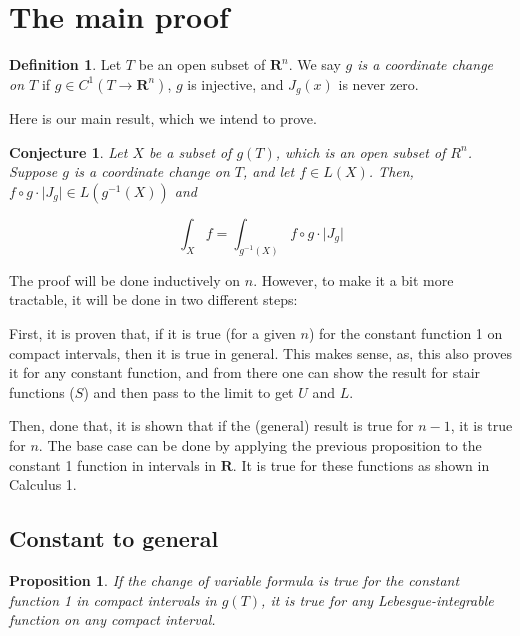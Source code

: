 \documentclass[11pt]{article}
\theoremstyle{definition}
\newtheorem{definition}{Definition}
\theoremstyle{plain}
\newtheorem{prop}{Proposition}
\newtheorem*{conj}{Conjecture}
\newcommand{\R}{\mathbf{R}}
\newcommand{\mo}{^{-1}}
\begin{document}
\section{The main proof}

\begin{definition}
Let $T$ be an open subset of $\R^n$. We say \emph{$g$ is a coordinate change on $T$} if $g \in C^1(T \rightarrow \R^n)$, $g$ is injective, and $J_g(x)$ is never zero.
\end{definition}

Here is our main result, which we intend to prove.

\begin{conj}
Let $X$ be a subset of $g(T)$, which is an open subset of $R^n$. Suppose $g$ is a coordinate change on $T$, and let $f \in L(X)$. Then, ${f \circ g \cdot \lvert J_g \rvert \in L(g\mo(X))}$ and

\[ \int_{X} f =  \int_{g\mo(X)} f \circ g \cdot \lvert J_g \rvert \]
\end{conj}

The proof will be done inductively on $n$. However, to make it a bit more tractable, it will be done in two different steps:

First, it is proven that, if it is true (for a given $n$) for the constant function 1 on compact intervals, then it is true in general. This makes sense, as, this also proves it for any constant function, and from there one can show the result for stair functions ($S$) and then pass to the limit to get $U$ and $L$.

Then, done that, it is shown that if the (general) result is true for $n-1$, it is true for $n$. The base case can be done by applying the previous proposition to the constant 1 function in intervals in $\R$. It is true for these functions as shown in Calculus 1.

\subsection{Constant to general}

\begin{prop}
If the change of variable formula is true for the constant function 1 in compact intervals in $g(T)$, it is true for any Lebesgue-integrable function on any compact interval.
\end{prop}
\end{document}
